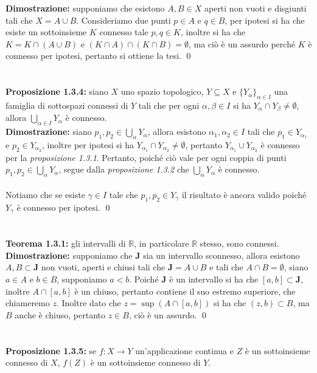 \documentclass{article}
\begin{document}
\textbf{Dimostrazione:} supponiamo che esistono $A, B \in X$ aperti non vuoti e disgiunti tali che $X = A \cup B$. Consideriamo due punti $p \in A$ e $q \in B$, per ipotesi si ha che esiste un sottoinsieme $K$ connesso tale $p, q \in K$, inoltre si ha che $K = K \cap (A \cup B)$ e $(K \cap A) \cap (K \cap B) = \emptyset$, ma ciò è un assurdo perché $K$ è connesso per ipotesi, pertanto si ottiene la tesi. \qed \\ \\ \\
\textbf{Proposizione 1.3.4:} siano $X$ uno spazio topologico, $Y \subseteq X$ e $\{ Y_\alpha \}_{\alpha \in I}$ una famiglia di sottospazi connessi di $Y$ tali che per ogni $\alpha, \beta \in I$ si ha $Y_\alpha \cap Y_\beta \neq \emptyset$, allora $\bigcup_{\alpha \in I} Y_\alpha$ è connesso. \\

\textbf{Dimostrazione:} siano $p_1, p_2 \in \bigcup_\alpha Y_\alpha$, allora esistono $\alpha_1, \alpha_2 \in I$ tali che $p_1 \in Y_{\alpha_1}$ e $p_2 \in Y_{\alpha_2}$, inoltre per ipotesi si ha $Y_{\alpha_1} \cap Y_{\alpha_2} \neq \emptyset$, pertanto $Y_{\alpha_1} \cup Y_{\alpha_2}$ è connesso per la \textit{proposizione 1.3.1}. Pertanto, poiché ciò vale per ogni coppia di punti $p_1, p_2 \in \bigcup_\alpha Y_\alpha$, segue dalla \textit{proposizione 1.3.2} che $\bigcup_\alpha Y_\alpha$ è connesso. \\ \\
Notiamo che se esiste $\gamma \in I$ tale che $p_1, p_2 \in Y_\gamma$ il risultato è ancora valido poiché $Y_\gamma$ è connesso per ipotesi. \qed \\ \\ \\
\textbf{Teorema 1.3.1:} gli intervalli di $\mathbb{R}$, in particolare $\mathbb{R}$ stesso, sono connessi. \\

\textbf{Dimostrazione:} supponiamo che $\mathbf{J}$ sia un intervallo sconnesso, allora esistono $A, B \subset \mathbf{J}$ non vuoti, aperti e chiusi tali che $\mathbf{J} = A \cup B$ e tali che $A \cap B = \emptyset$, siano $a \in A$ e $b \in B$, supponiamo $a < b$. Poiché $\mathbf{J}$ è un intervallo si ha che $[a, b] \subset \mathbf{J}$, inoltre $A \cap [a, b]$ è un chiuso, pertanto contiene il suo estremo superiore, che chiameremo $z$. Inoltre dato che $z = \sup (A \cap [a, b])$ si ha che $(z, b) \subset B$, ma $B$ anche è chiuso, pertanto $z \in B$, ciò è un assurdo. \qed \\ \\ \\
\textbf{Proposizione 1.3.5:} se $f : X \longrightarrow Y$ un'applicazione continua e $Z$ è un sottoinsieme connesso di $X$, $f(Z)$ è un sottoinsieme connesso di $Y$. \\
\end{document}
